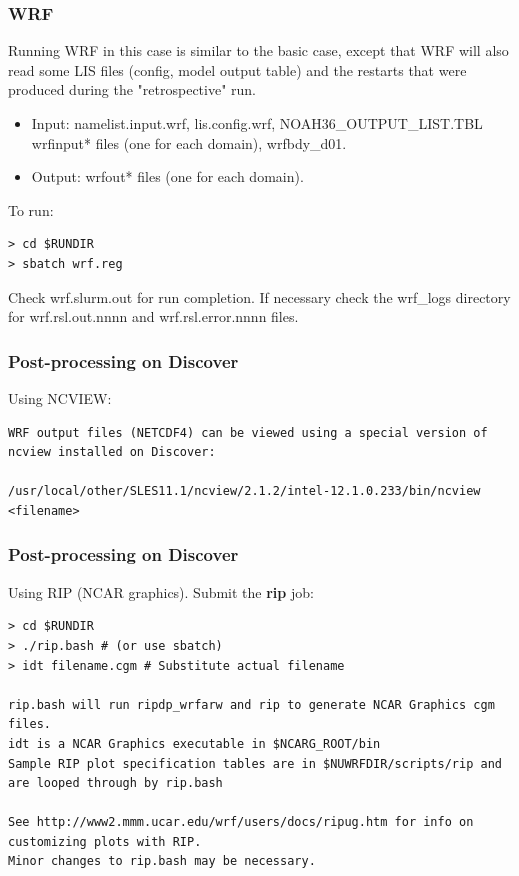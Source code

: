 \begin{frame}[fragile]\frametitle{WRF}

\footnotesize{
\hrulefill\par       
Running WRF in this case is similar to the basic case, except that WRF will also read some LIS files (config, model output table) and the restarts that were produced during the "retrospective" run.\\
\begin{itemize}
\item Input: namelist.input.wrf, lis.config.wrf, NOAH36\_OUTPUT\_LIST.TBL wrfinput* files (one for each domain), wrfbdy\_d01.
\item Output: wrfout* files (one for each domain).
\end{itemize}
}    
\hrulefill\par
\footnotesize{To run:}
\begin{lstlisting}
> cd $RUNDIR
> sbatch wrf.reg
\end{lstlisting}
Check wrf.slurm.out for run completion.
If necessary check the wrf\_logs directory for wrf.rsl.out.nnnn and wrf.rsl.error.nnnn files.


\end{frame}

\begin{frame}[fragile]
\frametitle{Post-processing on Discover}

Using NCVIEW:

\begin{lstlisting}
WRF output files (NETCDF4) can be viewed using a special version of ncview installed on Discover:

/usr/local/other/SLES11.1/ncview/2.1.2/intel-12.1.0.233/bin/ncview <filename>
\end{lstlisting}

\end{frame}

\begin{frame}[fragile]
\frametitle{Post-processing on Discover}

Using RIP (NCAR graphics). Submit the \textbf{rip} job:
\begin{lstlisting}
> cd $RUNDIR
> ./rip.bash # (or use sbatch)
> idt filename.cgm # Substitute actual filename

rip.bash will run ripdp_wrfarw and rip to generate NCAR Graphics cgm files.
idt is a NCAR Graphics executable in $NCARG_ROOT/bin
Sample RIP plot specification tables are in $NUWRFDIR/scripts/rip and are looped through by rip.bash

See http://www2.mmm.ucar.edu/wrf/users/docs/ripug.htm for info on customizing plots with RIP. 
Minor changes to rip.bash may be necessary.
\end{lstlisting}

\end{frame}


